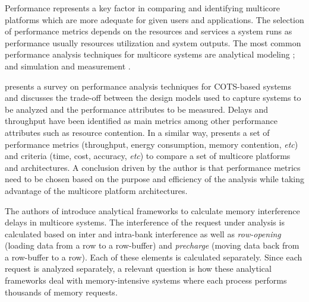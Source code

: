 \label{sec:relatedwork}
Performance represents a key factor in comparing and identifying multicore platforms which are more adequate for given users and applications. The selection of performance metrics depends on the resources and services a system runs as performance usually resources utilization and system outputs. The most common performance analysis techniques for multicore systems are analytical modeling \cite{Heechul2015,Kim14}; and simulation and measurement \cite{***,DBLP:journals/corr/TeodoroKAKFS15,10.1109/MS.2005.102}. 

\cite{10.1109/MS.2005.102} presents a survey on performance analysis techniques for COTS-based systems and discusses the trade-off between the design models used to capture systems to be analyzed and the performance attributes to be measured. Delays and throughput have been identified as main metrics among other performance attributes such as resource contention. In a similar way, \cite{Rakhee2014} presents a set of performance metrics (throughput, energy consumption, memory contention, \textit{etc}) and criteria (time, cost, accuracy, \textit{etc}) to compare a set of multicore platforms and architectures. A conclusion driven by the author is that performance metrics need to be chosen based on the purpose and efficiency of the analysis while taking advantage of the multicore platform architectures. 

The authors of \cite{Heechul2015,Kim14} introduce analytical frameworks to calculate memory interference delays in multicore systems. The interference of the request under analysis is calculated based on inter and intra-bank interference as well as \textit{row-opening} (loading data from a row to a row-buffer) and \textit{precharge} (moving data back from a row-buffer to a row). Each of these elements is calculated separately. Since each request is analyzed separately, a relevant question is how these analytical frameworks deal with memory-intensive systems where each process performs thousands of memory requests.


